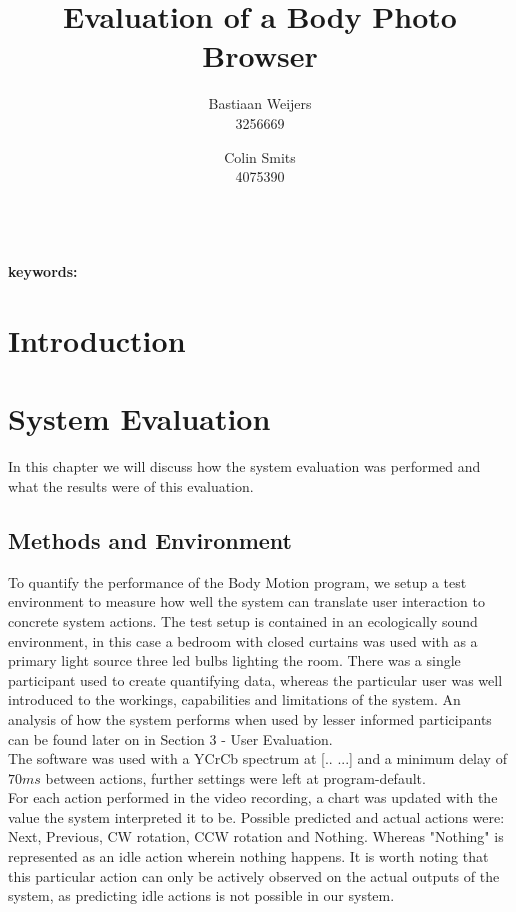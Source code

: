 \documentclass[11pt,a4paper]{article}
\author{Bastiaan Weijers \\ 3256669 \and Colin Smits \\ 4075390}
\title{Evaluation of a Body Photo Browser}
\begin{document}
\maketitle
{}\\
\textbf{keywords:}
 
\noindent\makebox[\linewidth]{\rule{\textwidth}{0.4pt}}
\section{Introduction}
\section{System Evaluation}
In this chapter we will discuss how the system evaluation was performed and what the results were of this evaluation. 
\subsection{Methods and Environment}
To quantify the performance of the Body Motion program, we setup a test environment to measure how well the system can translate user interaction to concrete system actions. The test setup is contained in an ecologically sound environment, in this case a bedroom with closed curtains was used with as a primary light source three led bulbs lighting the room. There was a single participant used to create quantifying data, whereas the particular user was well introduced to the workings, capabilities and limitations of the system. An analysis of how the system performs when used by lesser informed participants can be found later on in Section 3 - User Evaluation.
\\ The software was used with a YCrCb spectrum at [..   ...] and a minimum delay of $70ms$ between actions, further settings were left at program-default.
\\ For each action performed in the video recording, a chart was updated with the value the system interpreted it to be. Possible predicted and actual actions were: Next, Previous, CW rotation, CCW rotation and Nothing. Whereas "Nothing" is represented as an idle action wherein nothing happens. It is worth noting that this particular action can only be actively observed on the actual outputs of the system, as predicting idle actions is not possible in our system.
\end{document}
